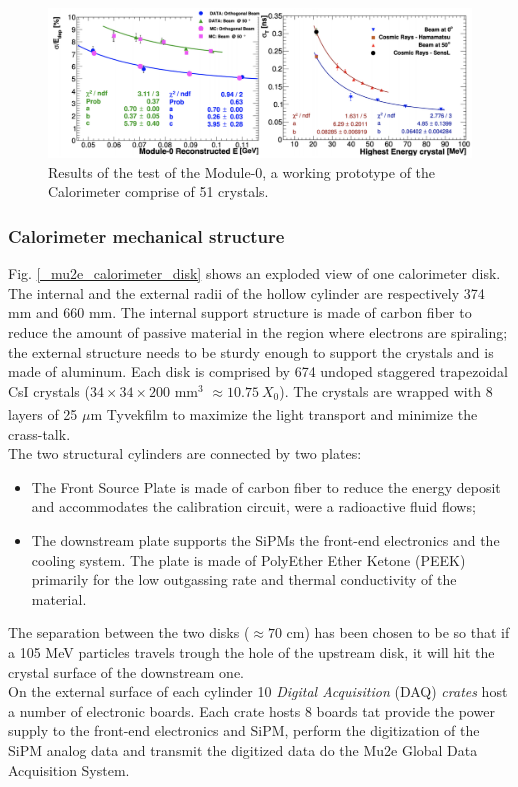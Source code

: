 \documentclass[12pt,a4paper,openright, oneside, titlepage]{book} %
\begin{document}
\begin{figure}[h!]
\centering
\includegraphics[scale=0.5]{calorimeter_test}
\caption{Results of the test of the Module-0, a working prototype of the Calorimeter comprise of 51 crystals. \cite{Donghia:2019} \cite{Calorimeter:2020}}
\label{_calorimeter_test}
\end{figure}


\subsubsection{Calorimeter mechanical structure}
Fig. \ref{_mu2e_calorimeter_disk} shows an exploded view of one calorimeter disk.
The internal and the external radii of the hollow cylinder are respectively 374 mm and 660 mm.
The internal support structure is made of carbon fiber to reduce the amount of passive material in the region 
where electrons are spiraling; 
the external structure needs to be sturdy enough to support the crystals and is made of aluminum. 
Each disk is comprised by 674 undoped staggered trapezoidal CsI crystals ($34\times34\times200$ mm$^3$  $\approx10.75\ X_0$). The crystals are wrapped with 8 layers of 25 $\mu$m Tyvek\textsuperscript \textregistered film to maximize the light transport and minimize the crass-talk. \\
The two structural cylinders are connected by two plates:
\begin{itemize}
\item The Front Source Plate is made of carbon fiber to reduce the energy deposit 
and accommodates the calibration circuit, were a radioactive fluid flows;
\item The downstream plate supports the SiPMs the front-end electronics and the cooling system. 
The plate is made of PolyEther Ether Ketone (PEEK) primarily for the low outgassing rate and thermal conductivity of the material.
\end{itemize} 
The separation between the two disks ($\approx 70$ cm) has been chosen to be so that if a 105 MeV particles travels trough the hole of the upstream disk, it will hit the crystal surface of the downstream one.\\
On the external surface of each cylinder 10 \textit{Digital Acquisition }(DAQ) \textit{crates} 
host a number of electronic boards.
Each crate hosts 8 boards tat provide the power supply to the front-end electronics and SiPM,
perform the digitization of the SiPM analog data and transmit the digitized data do the Mu2e 
Global Data Acquisition System.
\end{document}

